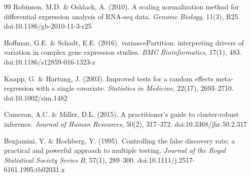 \documentclass[11pt,a4paper]{article}
\begin{document}
\begin{thebibliography}{99}
Robinson, M.D. \& Oshlack, A. (2010). A scaling normalization method for differential expression analysis of RNA-seq data. \textit{Genome Biology}, 11(3), R25. doi:10.1186/gb-2010-11-3-r25

Hoffman, G.E. \& Schadt, E.E. (2016). variancePartition: interpreting drivers of variation in complex gene expression studies. \textit{BMC Bioinformatics}, 17(1), 483. doi:10.1186/s12859-016-1323-z

Knapp, G. \& Hartung, J. (2003). Improved tests for a random effects meta-regression with a single covariate. \textit{Statistics in Medicine}, 22(17), 2693--2710. doi:10.1002/sim.1482

Cameron, A.C. \& Miller, D.L. (2015). A practitioner's guide to cluster-robust inference. \textit{Journal of Human Resources}, 50(2), 317--372. doi:10.3368/jhr.50.2.317

Benjamini, Y. \& Hochberg, Y. (1995). Controlling the false discovery rate: a practical and powerful approach to multiple testing. \textit{Journal of the Royal Statistical Society Series B}, 57(1), 289--300. doi:10.1111/j.2517-6161.1995.tb02031.x

\end{thebibliography}
\end{document}
